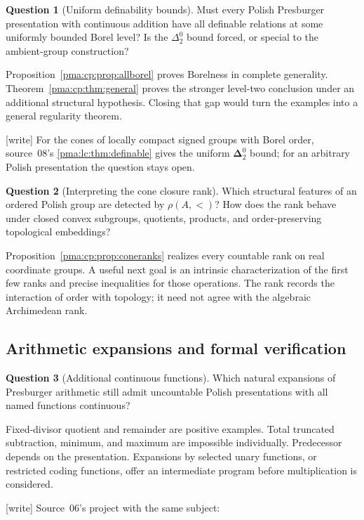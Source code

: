 \documentclass[11pt]{article}
\numberwithin{equation}{section}
\theoremstyle{definition}
\newtheorem{question}[question]{Question}
\theoremstyle{remark}
\newcommand{\Dtwo}{\boldsymbol{\Delta}^{0}_{2}}
\newcommand{\writetag}{\textup{\textsf{\small[write]}}}
\begin{document}
\begin{question}[Uniform definability bounds]
Must every Polish Presburger presentation with continuous addition have
all definable relations at some uniformly bounded Borel level? Is the
$\Delta^0_2$ bound forced, or special to the ambient-group construction?
\end{question}
Proposition~\ref{pma:cp:prop:allborel} proves Borelness in complete generality.
Theorem~\ref{pma:cp:thm:general} proves the stronger level-two conclusion under
an additional structural hypothesis. Closing that gap would turn the
examples into a general regularity theorem.

\noindent\writetag{} For the cones of locally compact signed groups with Borel
order, source~08's \cref{pma:lc:thm:definable} gives the uniform $\Dtwo$
bound; for an arbitrary Polish presentation the question stays open.

\begin{question}[Interpreting the cone closure rank]
Which structural features of an ordered Polish group are detected by
$\rho(A,<)$? How does the rank behave under closed convex subgroups,
quotients, products, and order-preserving topological embeddings?
\end{question}
Proposition~\ref{pma:cp:prop:coneranks} realizes every countable rank on real
coordinate groups. A useful next goal is an intrinsic characterization
of the first few ranks and precise inequalities for those operations.
The rank records the interaction of order with topology; it need not
agree with the algebraic Archimedean rank.

\subsection{Arithmetic expansions and formal verification}

\begin{question}[Additional continuous functions]
Which natural expansions of Presburger arithmetic still admit
uncountable Polish presentations with all named functions continuous?
\end{question}
Fixed-divisor quotient and remainder are positive examples. Total
truncated subtraction, minimum, and maximum are impossible individually.
Predecessor depends on the presentation. Expansions by selected unary
functions, or restricted coding functions, offer an intermediate program
before multiplication is considered.

\noindent\writetag{} Source~06's project with the same subject:
\end{document}
